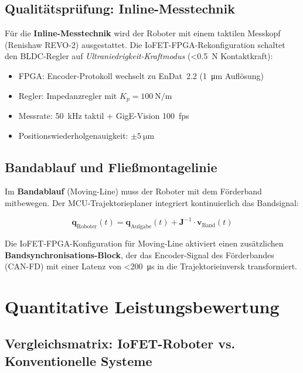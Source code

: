 ﻿\documentclass[a4paper,12pt]{scrreprt}
\theoremstyle{definition}
\begin{document}
\subsection{Qualitätsprüfung: Inline-Messtechnik}

Für die \textbf{Inline-Messtechnik} wird der Roboter mit einem
taktilen Messkopf (Renishaw REVO-2) ausgestattet. Die
IoFET-FPGA-Rekonfiguration schaltet den BLDC-Regler auf
\emph{Ultraniedrigkeit-Kraftmodus} (\SI{<0.5}{\newton}
Kontaktkraft):

\begin{itemize}
  \item FPGA: Encoder-Protokoll wechselt zu EnDat~2.2 (\SI{1}{\micro\meter} Auflösung)
  \item Regler: Impedanzregler mit $K_p = \SI{100}{\newton\per\meter}$
  \item Messrate: \SI{50}{\kilo\hertz} taktil + GigE-Vision 100~fps
  \item Positionswiederholgenauigkeit: $\pm\SI{5}{\micro\meter}$
\end{itemize}

\subsection{Bandablauf und Fließmontagelinie}

Im \textbf{Bandablauf} (Moving-Line) muss der Roboter mit dem
Förderband mitbewegen. Der MCU-Trajektorieplaner integriert
kontinuierlich das Bandsignal:

\begin{equation}
  \mathbf{q}_{\text{Roboter}}(t) = \mathbf{q}_{\text{Aufgabe}}(t)
  + \mathbf{J}^{-1} \cdot \mathbf{v}_{\text{Band}}(t)
\end{equation}

Die IoFET-FPGA-Konfiguration für Moving-Line aktiviert einen
zusätzlichen \textbf{Bandsyn\-chroni\-sations-Block}, der das
Encoder-Signal des Förderbandes (CAN-FD) mit einer Latenz von
\SI{<200}{\micro\second} in die Trajektorieinversk transformiert.

\section{Quantitative Leistungsbewertung}

\subsection{Vergleichsmatrix: IoFET-Roboter vs. Konventionelle Systeme}
\end{document}
